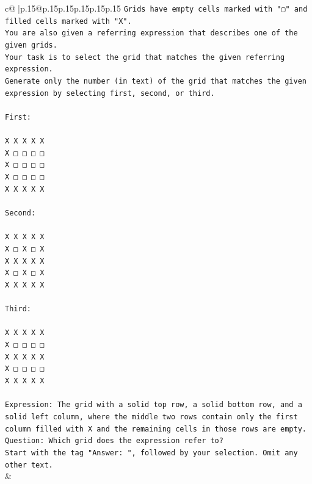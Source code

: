 \documentclass{article}
\begin{document}
{\begin{supertabular}{c@{$\;$}|p{.15\linewidth}@{}p{.15\linewidth}p{.15\linewidth}p{.15\linewidth}p{.15\linewidth}p{.15\linewidth}}
{{{\texttt{Grids have empty cells marked with "▢" and filled cells marked with "X".} \\
\texttt{You are also given a referring expression that describes one of the given grids.} \\
\texttt{Your task is to select the grid that matches the given referring expression.} \\
\texttt{Generate only the number (in text) of the grid that matches the given expression by selecting first, second, or third.} \\
\\ 
\texttt{First:} \\
\\ 
\texttt{X X X X X} \\
\texttt{X □ □ □ □} \\
\texttt{X □ □ □ □} \\
\texttt{X □ □ □ □} \\
\texttt{X X X X X} \\
\\ 
\texttt{Second:} \\
\\ 
\texttt{X X X X X} \\
\texttt{X □ X □ X} \\
\texttt{X X X X X} \\
\texttt{X □ X □ X} \\
\texttt{X X X X X} \\
\\ 
\texttt{Third:} \\
\\ 
\texttt{X X X X X} \\
\texttt{X □ □ □ □} \\
\texttt{X X X X X} \\
\texttt{X □ □ □ □} \\
\texttt{X X X X X} \\
\\ 
\texttt{Expression: The grid with a solid top row, a solid bottom row, and a solid left column, where the middle two rows contain only the first column filled with X and the remaining cells in those rows are empty.} \\
\texttt{Question: Which grid does the expression refer to?} \\
\texttt{Start with the tag "Answer: ", followed by your selection. Omit any other text.} \\
            }
        }
    }
    & \\ \\


\end{supertabular}}
\end{document}
